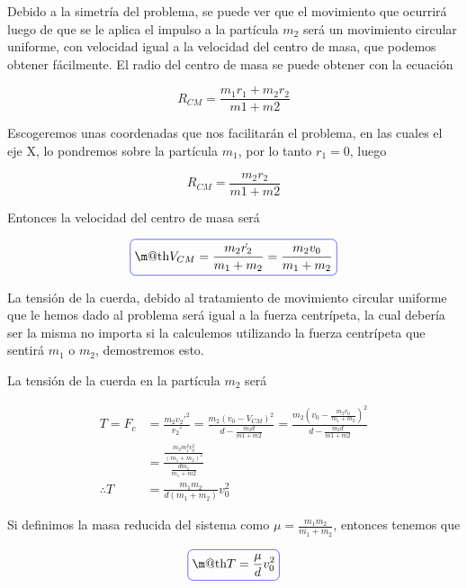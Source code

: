 \documentclass[a4paper,10pt]{article}
\makeatletter
\numberwithin{equation}{section}
\newcommand*{\boxcolor}{blue}
\renewcommand{\boxed}[1]{\textcolor{\boxcolor}{%
\tikz[baseline={([yshift=-1ex]current bounding box.center)}] \node [rectangle, minimum width=1ex,rounded corners,draw] {\normalcolor\m@th$\displaystyle#1$};}}
\makeatother
\begin{document}
\vspace{.3cm}

Debido a la simetría del problema, se puede ver que el movimiento que ocurrirá
luego de que se le aplica el impulso a la partícula $m_2$ será un movimiento
circular uniforme, con velocidad igual a la velocidad del centro de masa, que podemos
obtener fácilmente. El radio del centro de masa se puede obtener con la ecuación

\begin{equation}
 R_{CM} = \frac{m_1 r_1 + m_2 r_2}{m1+m2}
 \label{eq:RadioCM1}
\end{equation}

Escogeremos unas coordenadas que nos facilitarán el problema, en las cuales el eje
X, lo pondremos sobre la partícula $m_1$, por lo tanto $r_1 = 0$, luego

\begin{equation}
 R_{CM} = \frac{m_2 r_2}{m1+m2}
 \label{eq:RadioCM2}
\end{equation}

Entonces la velocidad del centro de masa será

\begin{equation}
 \boxed{V_{CM} = \frac{m_2 \dot{r_2}}{m_1+m_2} = \frac{m_2 v_0}{m_1 + m_2}}
\end{equation}

La tensión de la cuerda, debido al tratamiento de movimiento circular uniforme que 
le hemos dado al problema será igual a la fuerza centrípeta, la cual debería ser
la misma no importa si la calculemos utilizando la fuerza centrípeta que 
sentirá $m_1$ o $m_2$, demostremos esto. 

\vspace{.3cm}

La tensión de la cuerda en la partícula $m_2$ será

\begin{align*}
 T = F_c &= \frac{m_2 v_2'^2}{r_2'} = \frac{m_2 (v_0-V_{CM})^2}{d - \frac{m_2 d}{m1+m2}} = 
 \frac{m_2 (v_0 - \frac{m_2 v_0}{m_1 + m_2})^2}{d - \frac{m_2 d}{m1+m2}} \\
 &= \frac{\frac{m_2 m_1^2 v_0^2}{(m_1+m_2)^2}}{\frac{d m_1}{m_1 + m2}} \\
%
 \therefore T &= \frac{m_1 m_2}{d(m_1 + m_2)} v_0^2
\end{align*}

Si definimos la masa reducida del sistema como $\mu = \frac{m_1 m_2}{m_1 + m_2}$, 
entonces tenemos que

\begin{equation}
 \boxed{T = \frac{\mu}{d} v_0^2}
 \label{eq:TensionM2}
\end{equation}
\end{document}
